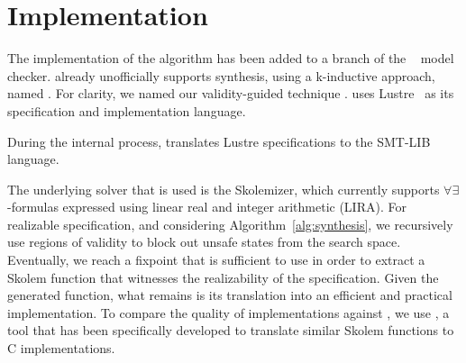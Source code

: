 \section{Implementation}
\label{sec:impl}

The implementation of the algorithm has been added to a branch of the  \jkind~\cite{jkind} model checker.  \jkind already unofficially supports synthesis,
using a k-inductive approach, named \jsyn. For clarity, we named
our validity-guided technique \jsynvg. \jkind uses Lustre~\cite{lustrev6} as its specification and implementation language.
\iffalse
, which functions as an intermediate representation to the Architecture Analysis and Design Language (\textsc{AADL})~\cite{feiler2006architecture}.
The latter is a high-level specification and analysis language with which
contracts are expressed, using the Assume-Guarantee Reasoning (\textsc{AGREE})
framework~\cite{NFM2012:CoGaMiWhLaLu}.
\andrew{it seems strange to be talking about AADL and maybe even AGREE  at all here.}

\fi

During the internal process, \jsynvg translates Lustre specifications to
the SMT-LIB language.
\iffalse
, with which the $\forall\exists$-formulas, regions of
validity, as well as the witnesses are expressed.
\fi
The underlying solver that is
used is the \aeval Skolemizer, which currently supports
$\forall\exists$-formulas expressed using linear real and integer arithmetic (LIRA).
%
For realizable specification, and considering Algorithm~\ref{alg:synthesis}, we
recursively use regions of validity to block out unsafe states from the search
space.
Eventually, we reach a fixpoint that is sufficient to use in order to extract
a Skolem function that witnesses the realizability of the specification. Given
the generated function, what remains is its translation
into an efficient and practical implementation. To compare the quality of implementations against \jsyn, we use
\smtlibtoc, a tool that has been specifically developed to translate
similar \aeval Skolem functions to C implementations.




